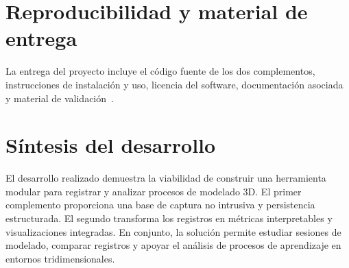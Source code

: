 \section{Reproducibilidad y material de entrega}

La entrega del proyecto incluye el código fuente de los dos complementos, instrucciones de instalación y uso, licencia del software, documentación asociada y material de validación~\cite{fsf_gpl3}. 

\section{Síntesis del desarrollo}

El desarrollo realizado demuestra la viabilidad de construir una herramienta modular para registrar y analizar procesos de modelado 3D. El primer complemento proporciona una base de captura no intrusiva y persistencia estructurada. El segundo transforma los registros en métricas interpretables y visualizaciones integradas. En conjunto, la solución permite estudiar sesiones de modelado, comparar registros y apoyar el análisis de procesos de aprendizaje en entornos tridimensionales.
